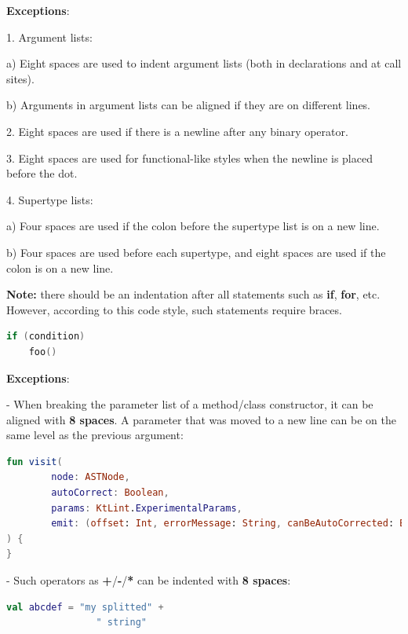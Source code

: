 \textbf{Exceptions}:

1.	Argument lists: \

a) Eight spaces are used to indent argument lists (both in declarations and at call sites). \

b) Arguments in argument lists can be aligned if they are on different lines. 



2.	Eight spaces are used if there is a newline after any binary operator.



3.	Eight spaces are used for functional-like styles when the newline is placed before the dot.



4.	Supertype lists: \

a) Four spaces are used if the colon before the supertype list is on a new line. \

b) Four spaces are used before each supertype, and eight spaces are used if the colon is on a new line. 



\textbf{Note:} there should be an indentation after all statements such as \textbf{if}, \textbf{for}, etc. However, according to this code style, such statements require braces. 



\begin{lstlisting}[language=Kotlin]
if (condition)
    foo()
\end{lstlisting}


\textbf{Exceptions}: 

- When breaking the parameter list of a method/class constructor, it can be aligned with \textbf{8 spaces}. A parameter that was moved to a new line can be on the same level as the previous argument:

    

\begin{lstlisting}[language=Kotlin]
fun visit(
        node: ASTNode,
        autoCorrect: Boolean,
        params: KtLint.ExperimentalParams,
        emit: (offset: Int, errorMessage: String, canBeAutoCorrected: Boolean) -> Unit
) {   
}
\end{lstlisting}
    

- Such operators as \textbf{+}/\textbf{-}/\textbf{*} can be indented with \textbf{8 spaces}:

    

\begin{lstlisting}[language=Kotlin]
val abcdef = "my splitted" +
                " string"
\end{lstlisting}
    

